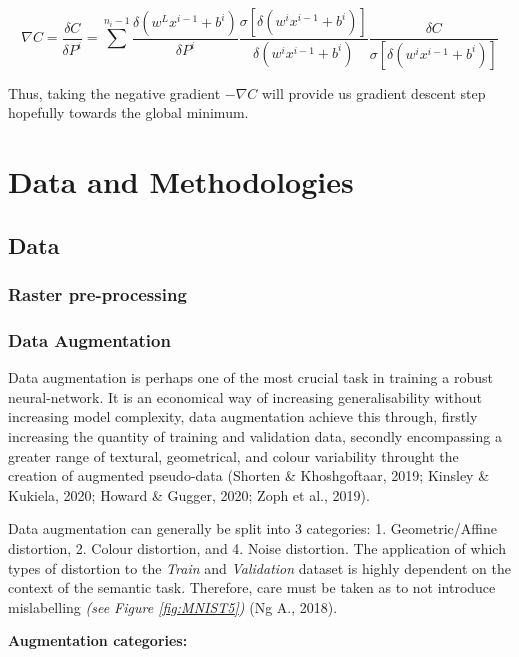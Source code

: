 \documentclass[11pt, a4paper, twoside]{report}
\begin{document}
\begin{equation}
  \label{Sum_cost_derivative}
  \nabla C = \frac{\delta C}{\delta P^{i}} = \sum^{n_{i}-1} \frac{\delta(w^{L}x^{i-1} + b^{i})}{\delta P^{i}} \frac{\sigma[\delta(w^{i}x^{i-1} + b^{i})]}{\delta (w^{i}x^{i-1} + b^{i})} \frac{\delta C}{\sigma[\delta(w^{i}x^{i-1} + b^{i})]}
\end{equation}

Thus, taking the negative gradient $-\nabla C$ will provide us gradient descent step hopefully towards the global minimum.

\newpage

\chapter{Data and Methodologies}\label{DataandMethods}

\section{Data}\label{Data}

\subsection{Raster pre-processing}

\subsection{Data Augmentation}\label{DataAug}

Data augmentation is perhaps one of the most crucial task in training a robust neural-network. It is an economical way of increasing generalisability without increasing model complexity, data augmentation achieve this through, firstly increasing the quantity of training and validation data, secondly encompassing a greater range of textural, geometrical, and colour variability throught the creation of augmented pseudo-data (Shorten \& Khoshgoftaar, 2019; Kinsley \& Kukiela, 2020; Howard \& Gugger, 2020; Zoph et al., 2019).\\\par

Data augmentation can generally be split into 3 categories: 1. Geometric/Affine distortion, 2. Colour distortion, and 4. Noise distortion. The application of which types of distortion to the \textit{Train} and \textit{Validation} dataset is highly dependent on the context of the semantic task. Therefore, care must be taken as to not introduce mislabelling \textit{(see Figure \ref{fig:MNIST5})} (Ng A., 2018).\\\par
\textbf{Augmentation categories:}
\end{document}
